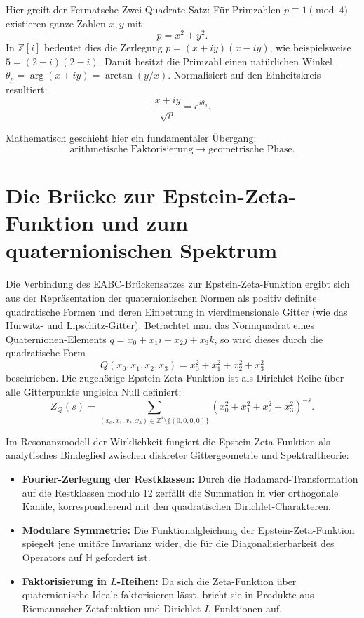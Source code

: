 \documentclass[11pt,a4paper]{scrartcl}
\begin{document}
Hier greift der Fermatsche Zwei-Quadrate-Satz: Für Primzahlen $p \equiv 1 \pmod 4$ existieren ganze Zahlen $x, y$ mit
\[
p = x^2 + y^2.
\]
In $\mathbb{Z}[i]$ bedeutet dies die Zerlegung $p = (x + iy)(x - iy)$, wie beispielsweise $5 = (2 + i)(2 - i)$. Damit besitzt die Primzahl einen natürlichen Winkel $\theta_p = \arg(x + iy) = \arctan(y/x)$. Normalisiert auf den Einheitskreis resultiert:
\[
\frac{x + iy}{\sqrt{p}} = e^{i\theta_p}.
\]

Mathematisch geschieht hier ein fundamentaler Übergang:
\[
\text{arithmetische Faktorisierung} \longrightarrow \text{geometrische Phase}.
\]

\section{Die Brücke zur Epstein-Zeta-Funktion und zum quaternionischen Spektrum}

Die Verbindung des EABC-Brückensatzes zur Epstein-Zeta-Funktion ergibt sich aus der Repräsentation der quaternionischen Normen als positiv definite quadratische Formen und deren Einbettung in vierdimensionale Gitter (wie das Hurwitz- und Lipschitz-Gitter). Betrachtet man das Normquadrat eines Quaternionen-Elements $q = x_0 + x_1 i + x_2 j + x_3 k$, so wird dieses durch die quadratische Form
\[
Q(x_0, x_1, x_2, x_3) = x_0^2 + x_1^2 + x_2^2 + x_3^2
\]
beschrieben. Die zugehörige Epstein-Zeta-Funktion ist als Dirichlet-Reihe über alle Gitterpunkte ungleich Null definiert:
\[
Z_Q(s) = \sum_{(x_0,x_1,x_2,x_3) \in \mathbb{Z}^4 \setminus \{(0,0,0,0)\}} \left( x_0^2 + x_1^2 + x_2^2 + x_3^2 \right)^{-s}.
\]

Im Resonanzmodell der Wirklichkeit fungiert die Epstein-Zeta-Funktion als analytisches Bindeglied zwischen diskreter Gittergeometrie und Spektraltheorie:
\begin{itemize}
    \item \textbf{Fourier-Zerlegung der Restklassen:} Durch die Hadamard-Transformation auf die Restklassen modulo 12 zerfällt die Summation in vier orthogonale Kanäle, korrespondierend mit den quadratischen Dirichlet-Charakteren.
    \item \textbf{Modulare Symmetrie:} Die Funktionalgleichung der Epstein-Zeta-Funktion spiegelt jene unitäre Invarianz wider, die für die Diagonalisierbarkeit des Operators auf $\mathbb{H}$ gefordert ist.
    \item \textbf{Faktorisierung in $L$-Reihen:} Da sich die Zeta-Funktion über quaternionische Ideale faktorisieren lässt, bricht sie in Produkte aus Riemannscher Zetafunktion und Dirichlet-$L$-Funktionen auf.
\end{itemize}
\end{document}
